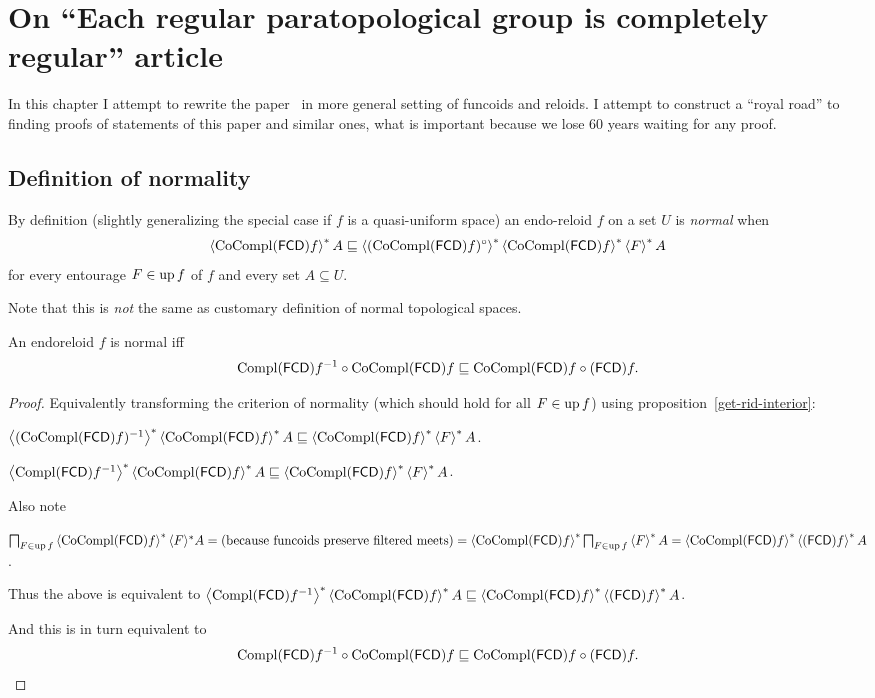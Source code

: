 \chapter{On ``Each regular paratopological group is completely regular'' article}

In this chapter I attempt to rewrite the paper~\cite{2014arXiv1410.1504B} in more general setting of funcoids and reloids.
I attempt to construct a ``royal road'' to finding proofs of statements of this paper and similar ones, what is
important because we lose 60 years waiting for any proof.

\section{Definition of normality}


By definition (slightly generalizing the special case if $f$ is a
quasi-uniform space) an endo-reloid $f$ on a set $U$ is \emph{normal} when
\[ \left\langle \operatorname{CoCompl} (\mathsf{FCD}) f\right\rangle ^{\ast} A \sqsubseteq \left\langle 
(\operatorname{CoCompl} (\mathsf{FCD}) f)^{\circ}\right\rangle ^{\ast} \left\langle \operatorname{CoCompl} (\mathsf{FCD})
f \right\rangle ^{\ast} \left\langle F\right\rangle ^{\ast} A \] for every entourage $F \in
\operatorname{up} f$ of $f$ and every set $A \subseteq U$.

Note that this is \emph{not} the same as customary definition of normal topological spaces.

\begin{thm}
  An endoreloid $f$ is normal iff
  \[ \operatorname{Compl} (\mathsf{FCD}) f^{- 1} \circ \operatorname{CoCompl} (\mathsf{FCD}) f \sqsubseteq
  \operatorname{CoCompl} (\mathsf{FCD}) f \circ (\mathsf{FCD}) f. \]
\end{thm}

\begin{proof}
  Equivalently transforming the criterion of normality (which should hold for
  all $F \in \operatorname{up} f$) using proposition~\ref{get-rid-interior}:

  $\left\langle (\operatorname{CoCompl} (\mathsf{FCD}) f)^{- 1}\right\rangle ^{\ast}
  \left\langle \operatorname{CoCompl} (\mathsf{FCD}) f\right\rangle ^{\ast} A \sqsubseteq
  \left\langle \operatorname{CoCompl} (\mathsf{FCD}) f\right\rangle ^{\ast} \left\langle F\right\rangle ^{\ast} A$.

  $\left\langle \operatorname{Compl} (\mathsf{FCD}) f^{- 1}\right\rangle ^{\ast}
  \left\langle \operatorname{CoCompl} (\mathsf{FCD}) f\right\rangle ^{\ast} A \sqsubseteq
  \left\langle \operatorname{CoCompl} (\mathsf{FCD}) f\right\rangle ^{\ast} \left\langle F\right\rangle ^{\ast} A$.

  Also note
  
  $\bigsqcap_{F \in \operatorname{up} f} \left\langle  \operatorname{CoCompl} (\mathsf{FCD}) f
  \right\rangle ^{\ast} \langle F \rangle^{\ast} A = \text{(because funcoids preserve
  filtered meets)} = \left\langle  \operatorname{CoCompl} (\mathsf{FCD}) f
  \right\rangle ^{\ast}  \bigsqcap_{F \in \operatorname{up} f} \left\langle F\right\rangle ^{\ast} A =
  \left\langle  \operatorname{CoCompl} (\mathsf{FCD}) f \right\rangle ^{\ast}
  \left\langle  (\mathsf{FCD}) f \right\rangle ^{\ast} A$.

  Thus the above is equivalent to
  $\left\langle \operatorname{Compl} (\mathsf{FCD}) f^{- 1}\right\rangle ^{\ast}
  \left\langle \operatorname{CoCompl} (\mathsf{FCD}) f\right\rangle ^{\ast} A \sqsubseteq
  \left\langle  \operatorname{CoCompl} (\mathsf{FCD}) f \right\rangle ^{\ast}
  \left\langle  (\mathsf{FCD}) f \right\rangle ^{\ast} A$.

  And this is in turn equivalent to
  \[ \operatorname{Compl} (\mathsf{FCD}) f^{- 1} \circ \operatorname{CoCompl} (\mathsf{FCD}) f \sqsubseteq
  \operatorname{CoCompl} (\mathsf{FCD}) f \circ (\mathsf{FCD}) f. \]
\end{proof}
